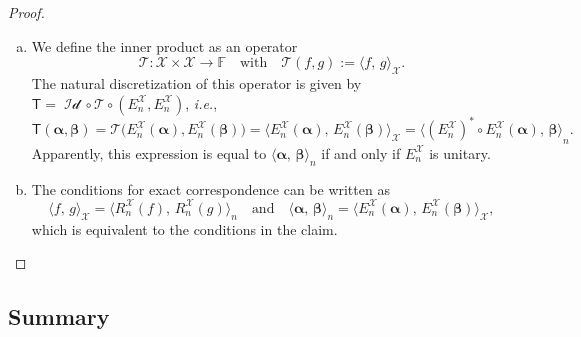 \documentclass[a4paper]{paper}
\newcommand{\Spc}[1]{\mathscr{#1}}
\newcommand{\Field}{\mathbb{F}}
\newcommand{\Op}[1]{\mathcal{#1}}
\newcommand{\DiscOp}[1]{\mathsf{#1}}
\newcommand*{\EXT}[2]{\ensuremath{E_{#1}^{#2}}}
\newcommand*{\REST}[2]{\ensuremath{R_{#1}^{#2}}}
\newcommand*{\RnX}{\ensuremath{\REST{n}{\Spc{X}}}}
\newcommand*{\EnX}{\ensuremath{\EXT{n}{\Spc{X}}}}
\DeclareMathOperator{\Id}{Id}
\newcommand*{\INNER}[2]{\ensuremath{\langle #1,\,#2\rangle}}
\newcommand*{\INNERbig}[2]{\ensuremath{\big\langle #1,\,#2\big\rangle}}
\newcommand{\ie}{\textsl{i.e.}\xspace}
\newcommand{\valpha}{\boldsymbol{\alpha}}
\newcommand{\vbeta}{\boldsymbol{\beta}}
\begin{document}
\begin{proof}
 \begin{enumerate}[(a)]
  \item We define the inner product as an operator
  \begin{equation*}
   \Op{T} \colon \Spc{X} \times \Spc{X} \to \Field
   \quad \text{with} \quad
   \Op{T}(f, g) := \INNER{f}{g}_{\Spc{X}}.
  \end{equation*}
  The natural discretization of this operator is given by $\DiscOp{T} = \Op{\Id} \circ \Op{T} \circ (\EnX, \EnX)$, \ie,
  \begin{equation*}
   \DiscOp{T}(\valpha, \vbeta) 
   = \Op{T}\big( \EnX(\valpha), \EnX(\vbeta) \big) 
   = \INNERbig{\EnX(\valpha)}{\EnX(\vbeta)}_{\Spc{X}}
   = \INNERbig{(\EnX)^* \circ \EnX(\valpha)}{\vbeta}_n.
  \end{equation*}
  Apparently, this expression is equal to $\INNER{\valpha}{\vbeta}_n$ if and only if $\EnX$ is unitary.

  \item The conditions for exact correspondence can be written as
  \begin{equation*}
   \INNER{f}{g}_{\Spc{X}} = \INNERbig{\RnX(f)}{\RnX(g)}_n
   \quad \text{and} \quad
   \INNER{\valpha}{\vbeta}_n = \INNERbig{\EnX(\valpha)}{\EnX(\vbeta)}_{\Spc{X}},
  \end{equation*}
  which is equivalent to the conditions in the claim.
 \end{enumerate}
\end{proof}



\subsection{Summary}
\label{subsec:prop:summary}
\end{document}
